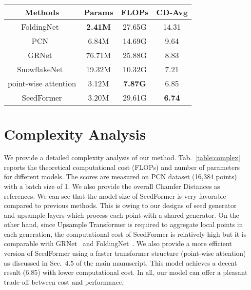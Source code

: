 \begin{table*}[t]
	\centering
\footnotesize
	\setlength{\tabcolsep}{10pt}
\caption{Complexity analysis on PCN dataset evaluated as the number of parameters (Params) and theoretical computational cost (FLOPs). We also report the average CDs of all categories as references.}
	\vspace{5pt}
	\begin{tabular}{c|cc|c}
		\toprule[1pt]
		Methods & Params & FLOPs & CD-Avg   \\
		\midrule[0.3pt]
		FoldingNet~\cite{yang2018foldingnet} & \textbf{2.41M} & 27.65G & 14.31 \\
		PCN~\cite{yuan2018pcn} & 6.84M & 14.69G & 9.64\\
		GRNet~\cite{xie2020grnet} & 76.71M & 25.88G & 8.83\\
		SnowflakeNet~\cite{xiang2021snowflakenet} & 19.32M & 10.32G & 7.21 \\
		\midrule[0.3pt]
		point-wise attention & 3.12M & \textbf{7.87G} & 6.85\\
		SeedFormer & 3.20M & 29.61G & \textbf{6.74} \\
		\bottomrule[1pt]
	\end{tabular}
	
	\label{table:complex}
\end{table*}

\section{Complexity Analysis}
\label{sec:supp:complex}
We provide a detailed complexity analysis of our method. Tab.~\ref{table:complex} reports the theoretical computational cost (FLOPs) and number of parameters for different models. The scores are measured on PCN dataset (16,384 points) with a batch size of 1. We also provide the overall Chamfer Distances as references. We can see that the model size of SeedFormer is very favorable compared to previous methods. This is owing to our designs of seed generator and upsample layers which process each point with a shared generator. 
On the other hand, since Upsample Transformer is required to aggregate local points in each generation, the computational cost of SeedFormer is relatively high but it is comparable with GRNet~\cite{xie2020grnet} and FoldingNet~\cite{yang2018foldingnet}. We also provide a more efficient version of SeedFormer using a faster transformer structure (point-wise attention) as discussed in Sec.~4.5 of the main manuscript. This model achieves a decent result (6.85) with lower computational cost. In all, our model can offer a pleasant trade-off between cost and performance.




